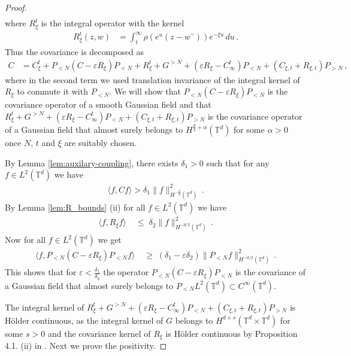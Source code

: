 \documentclass[11pt]{article}
\numberwithin{equation}{section}
\theoremstyle{definition}
\renewcommand{\leq}{\;\leqslant\;}                   %
\renewcommand{\geq}{\;\geqslant\;}                   %
\def\eps{\varepsilon}
\def\T{\mathbb{T}}
\newcommand{\PN}{ {P_{< N}} }
\newcommand{\PNN}{ {P_{>N}} }
\begin{document}
\begin{proof}
\begin{align*}
\end{align*}
where $R_\xi^t$ is the integral operator with the kernel
\begin{align*}
R_\xi^t(z,w) &= \int_t^\infty \rho(e^u(z-w¨)) e^{-\xi u} \, du \,.
\end{align*}
Thus the covariance is decomposed as
\begin{align}\label{eq:c_decomp}
C &= C_\xi^t   +  \PN ( C  - \eps R_\xi) \PN  + R_\xi^t + G^{>N} +  (   \eps R_\xi - C_\infty^t  ) \PN  +    (C_{\xi,t} + R_{\xi,t})      \PNN\,,
\end{align}
where in the second term we used translation invariance of the integral kernel of $R_\xi$ to commute it with $\PN$. We will show that $\PN ( C  - \eps R_\xi) \PN$ is the covariance operator of a smooth Gaussian field and that $R_\xi^t + G^{>N} +  (   \eps R_\xi - C_\infty^t  ) \PN  +    (C_{\xi,t} + R_{\xi,t}) \PNN$ is the covariance operator of a Gaussian field that almost surely belongs to $H^{\frac{d}{2}+\alpha}(\T^d)$ for some $\alpha > 0$ once $N$, $t$ and $\xi$ are suitably chosen.

By Lemma \ref{lem:auxilary-coupling}, there exists $\delta_1 > 0$ such that for any $f \in L^2(\T^d)$ we have
\begin{align*}
\langle f,  C  f \rangle   > \delta_1 \| f\|_{H^{-\frac{d}{2}}(\T^d)}^2\,.
\end{align*}
By Lemma \ref{lem:R_bounds} (ii) for all $f \in L^2(\T^d)$ we have 
\begin{align*}
\langle f, R_\xi f \rangle & \leq \delta_2 \|f\|_{H^{-d/2}(\T^d)}^2\,.
\end{align*}
Now for all $f \in L^2(\T^d)$ we get 
\begin{align*}
\langle f, \PN (C - \eps R_\xi) \PN f \rangle &\geq (\delta_1 - \eps \delta_2) \|\PN f\|_{H^{-d/2}(\T^d)}^2\,.
\end{align*}
This shows that for $\eps < \frac{\delta_1}{\delta_2}$ the operator $\PN (C - \eps R_\xi) \PN$ is the covariance of a Gaussian field that almost surely belongs to $\PN L^2(\T^d) \subset C^\infty(\T^d)$.


The integral kernel of $R_\xi^t + G^{>N} +  (   \eps R_\xi - C_\infty^t  ) \PN  +  (C_{\xi,t} + R_{\xi,t}) \PNN$ is Hölder continuous, as the integral kernel of $G$ belongs to $H^{d+s}(\T^d \times \T^d)$ for some $s > 0$ and the covariance kernel of $R_\xi$ is Hölder continuous by Proposition 4.1. (ii) in \cite{JSW}. Next we prove the positivity.


\end{proof}
\end{document}
